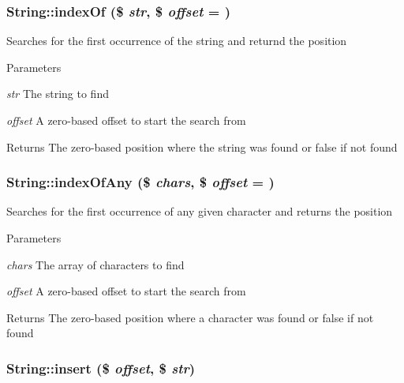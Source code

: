 \hypertarget{classString_a5069041d10f95e4ec9a4be3cd17ab180}{
\subsubsection[{indexOf}]{\setlength{\rightskip}{0pt plus 5cm}String::indexOf (\$ {\em str}, \/  \$ {\em offset} = {})}}
\label{classString_a5069041d10f95e4ec9a4be3cd17ab180}
Searches for the first occurrence of the string and returnd the position 
\begin{DoxyParams}{Parameters}
\item[{\em str}]The string to find \item[{\em offset}]A zero-\/based offset to start the search from \end{DoxyParams}
\begin{DoxyReturn}{Returns}
The zero-\/based position where the string was found or false if not found 
\end{DoxyReturn}
\hypertarget{classString_a1c8a1df4030974f7ae48f59c1a9dca80}{
\subsubsection[{indexOfAny}]{\setlength{\rightskip}{0pt plus 5cm}String::indexOfAny (\$ {\em chars}, \/  \$ {\em offset} = {})}}
\label{classString_a1c8a1df4030974f7ae48f59c1a9dca80}
Searches for the first occurrence of any given character and returns the position 
\begin{DoxyParams}{Parameters}
\item[{\em chars}]The array of characters to find \item[{\em offset}]A zero-\/based offset to start the search from \end{DoxyParams}
\begin{DoxyReturn}{Returns}
The zero-\/based position where a character was found or false if not found 
\end{DoxyReturn}
\hypertarget{classString_abe7d7e1e2b57ab7dcd01d8e2d1d53148}{
\subsubsection[{insert}]{\setlength{\rightskip}{0pt plus 5cm}String::insert (\$ {\em offset}, \/  \$ {\em str})}}
